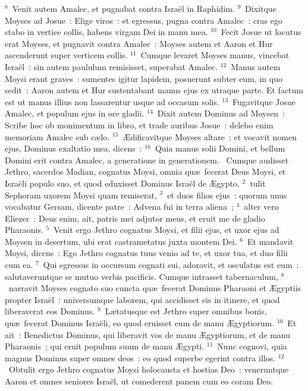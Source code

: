 ${}^{8}$~Venit autem Amalec, et pugnabat contra Isra\"el in Raphidim.
${}^{9}$~Dixitque Moyses ad Josue~: Elige viros~: et egressus, pugna contra Amalec~: cras ego stabo in vertice collis, habens virgam Dei in manu mea.
${}^{10}$~Fecit Josue ut locutus erat Moyses, et pugnavit contra Amalec~: Moyses autem et Aaron et Hur ascenderunt super verticem collis.
${}^{11}$~Cumque levaret Moyses manus, vincebat Isra\"el~: sin autem paululum remisisset, superabat Amalec.
${}^{12}$~Manus autem Moysi erant graves~: sumentes igitur lapidem, posuerunt subter eum, in quo sedit~: Aaron autem et Hur sustentabant manus ejus ex utraque parte. Et factum est ut manus illius non lassarentur usque ad occasum solis.
${}^{13}$~Fugavitque Josue Amalec, et populum ejus in ore gladii.
${}^{14}$~Dixit autem Dominus ad Moysen~: Scribe hoc ob monimentum in libro, et trade auribus Josue~: delebo enim memoriam Amalec sub c\ae lo.
${}^{15}$~\AE dificavitque Moyses altare~: et vocavit nomen ejus, Dominus exaltatio mea, dicens~:
${}^{16}$~Quia manus solii Domini, et bellum Domini erit contra Amalec, a generatione in generationem.
~Cumque audisset Jethro, sacerdos Madian, cognatus Moysi, omnia qu\ae\ fecerat Deus Moysi, et Isra\"eli populo suo, et quod eduxisset Dominus Isra\"el de \AE gypto,
${}^{2}$~tulit Sephoram uxorem Moysi quam remiserat,
${}^{3}$~et duos filios ejus~: quorum unus vocabatur Gersam, dicente patre~: Advena fui in terra aliena~;
${}^{4}$~alter vero Eliezer~: Deus enim, ait, patris mei adjutor meus, et eruit me de gladio Pharaonis.
${}^{5}$~Venit ergo Jethro cognatus Moysi, et filii ejus, et uxor ejus ad Moysen in desertum, ubi erat castrametatus juxta montem Dei.
${}^{6}$~Et mandavit Moysi, dicens~: Ego Jethro cognatus tuus venio ad te, et uxor tua, et duo filii cum ea.
${}^{7}$~Qui egressus in occursum cognati sui, adoravit, et osculatus est eum~: salutaveruntque se mutuo verbis pacificis. Cumque intrasset tabernaculum,
${}^{8}$~narravit Moyses cognato suo cuncta qu\ae\ fecerat Dominus Pharaoni et \AE gyptiis propter Isra\"el~: universumque laborem, qui accidisset eis in itinere, et quod liberaverat eos Dominus.
${}^{9}$~L\ae tatusque est Jethro super omnibus bonis, qu\ae\ fecerat Dominus Isra\"eli, eo quod eruisset eum de manu \AE gyptiorum.
${}^{10}$~Et ait~: Benedictus Dominus, qui liberavit vos de manu \AE gyptiorum, et de manu Pharaonis~; qui eruit populum suum de manu \AE gypti.
${}^{11}$~Nunc cognovi, quia magnus Dominus super omnes deos~: eo quod superbe egerint contra illos.
${}^{12}$~Obtulit ergo Jethro cognatus Moysi holocausta et hostias Deo~: veneruntque Aaron et omnes seniores Isra\"el, ut comederent panem cum eo coram Deo.


